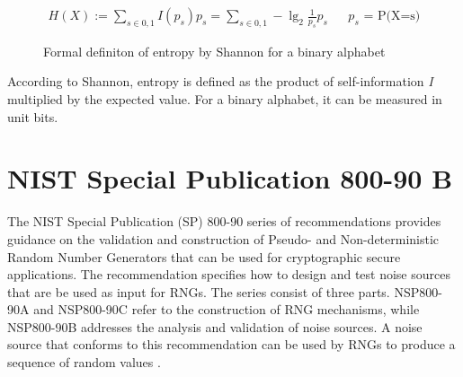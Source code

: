 \begin{figure}[H]
	\begin{align*}
	\displaystyle H(X) := \sum_{s \in {0,1}} I(p_s) p_s = \sum_{s \in {0,1}} -\lg_2 \frac{1}{p_s} p_s && \text{$p_s$ = P(X=s)}
	\end{align*}
	\caption{Formal definiton of entropy by Shannon for a binary alphabet}
	\label{fig:form-entropy-shan}
\end{figure}
According to Shannon, entropy is defined as the product of self-information \textit{I} multiplied by the expected value. For a binary alphabet, it can be measured in unit bits. 



\section{NIST Special Publication 800-90 B}

The NIST Special Publication (SP) 800-90 series of recommendations provides 
guidance on the validation and construction of Pseudo- and Non-deterministic Random Number Generators that can be used for cryptographic secure applications. The recommendation specifies how to design and test noise sources that are be used as input for RNGs. The series consist of three parts. NSP800-90A and NSP800-90C refer to the construction of RNG mechanisms, while NSP800-90B addresses the analysis and validation of noise sources. A noise source that conforms to this recommendation can be used by RNGs to produce a sequence of random values \cite{rukhin2010nist}.





